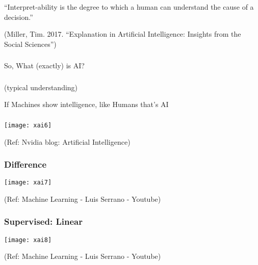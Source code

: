 \begin{frame}[fragile]\frametitle{}


\begin{center}
``Interpret-ability is the degree to which a human can 
understand the cause of a decision.''
\end{center}


\tiny{(Miller, Tim. 2017. ``Explanation in Artificial Intelligence: Insights from the Social Sciences'')}

\end{frame}

\begin{frame}[fragile]\frametitle{}
\begin{center}
{\Large So, What (exactly) is AI?}
\end{center}
\end{frame}

\begin{frame}[fragile]\frametitle{}
\begin{center}
(typical understanding)

{\Huge If Machines show intelligence, like Humans that's AI}
\end{center}
\end{frame}

\begin{frame}[fragile]\frametitle{}
\begin{center}
\texttt{[image: xai6]}
\end{center}

\tiny{(Ref: Nvidia blog: Artificial Intelligence)}
\end{frame}

\begin{frame}[fragile]\frametitle{Difference}
\begin{center}
\texttt{[image: xai7]}
\end{center}

\tiny{(Ref: Machine Learning - Luis Serrano - Youtube)}
\end{frame}

\begin{frame}[fragile]\frametitle{Supervised: Linear}
\begin{center}
\texttt{[image: xai8]}
\end{center}

\tiny{(Ref: Machine Learning - Luis Serrano - Youtube)}
\end{frame}

